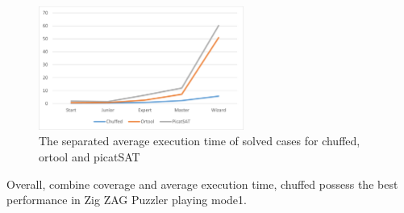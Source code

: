 \begin{figure}[htbp]
    \centering
    \includegraphics[width=0.6\textwidth]{figs/mode1solverscomparison.png}
    \caption{The separated average execution time of solved cases for chuffed, ortool and picatSAT}
    \label{fig:compare}
\end{figure}
Overall, combine coverage and average execution time, chuffed possess the best performance in Zig ZAG Puzzler playing mode1.
